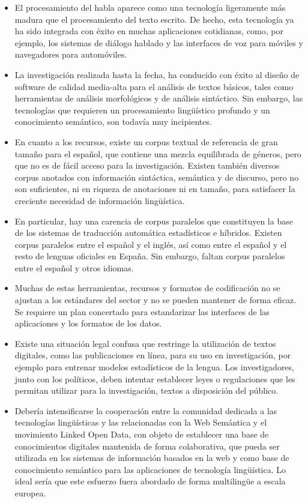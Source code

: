 \begin{multicols}{2}
\begin{itemize}
  \item El procesamiento del habla aparece como una tecnología ligeramente más madura que el procesamiento del texto escrito. De hecho, esta tecnología ya ha sido integrada con éxito en muchas aplicaciones cotidianas, como, por ejemplo, los sistemas de diálogo hablado y las interfaces de voz para móviles y navegadores para automóviles.
  \item La investigación realizada hasta la fecha, ha conducido con éxito al diseño de software de calidad media-alta para el análisis de textos básicos, tales como herramientas de análisis morfológicos y de análisis sintáctico. Sin embargo, las tecnologías que requieren un procesamiento lingüístico profundo y un conocimiento semántico, son todavía muy incipientes.
  \item En cuanto a los recursos, existe un corpus textual de referencia de gran tamaño para el español, que contiene una mezcla equilibrada de géneros, pero que no es de fácil acceso para la investigación. Existen también diversos corpus anotados con información sintáctica, semántica y de discurso, pero no son suficientes, ni en riqueza de anotaciones ni en tamaño, para satisfacer la creciente necesidad de información lingüística.
  \item En particular, hay una carencia de corpus paralelos que constituyen la base de los sistemas de traducción automática estadísticos e híbridos. Existen corpus paralelos entre el español y el inglés, así como entre el español y el resto de lenguas oficiales en España. Sin embargo, faltan corpus paralelos entre el español y otros idiomas.
  \item Muchas de estas herramientas, recursos y formatos de codificación no se ajustan a los estándares del sector y no se pueden mantener de forma eficaz. Se requiere un plan concertado para estandarizar las interfaces de las aplicaciones y los formatos de los datos.
  \item Existe una situación legal confusa que restringe la utilización de textos digitales, como las publicaciones en línea, para su uso en investigación, por ejemplo para entrenar modelos estadísticos de la lengua. Los investigadores, junto con los políticos, deben intentar establecer leyes o regulaciones que les permitan utilizar para la investigación, textos a disposición del público.
  \item Debería intensificarse la cooperación entre la comunidad dedicada a las tecnologías lingüísticas y las relacionadas con la Web Semántica y el movimiento Linked Open Data, con objeto de establecer una base de conocimientos digitales mantenida de forma colaborativa, que pueda ser utilizada en los sistemas de información basados en la web y como base de conocimiento semántico para las aplicaciones de tecnología lingüística. Lo ideal sería que este esfuerzo fuera abordado de forma multilingüe a escala europea.
\end{itemize}


\end{multicols}

